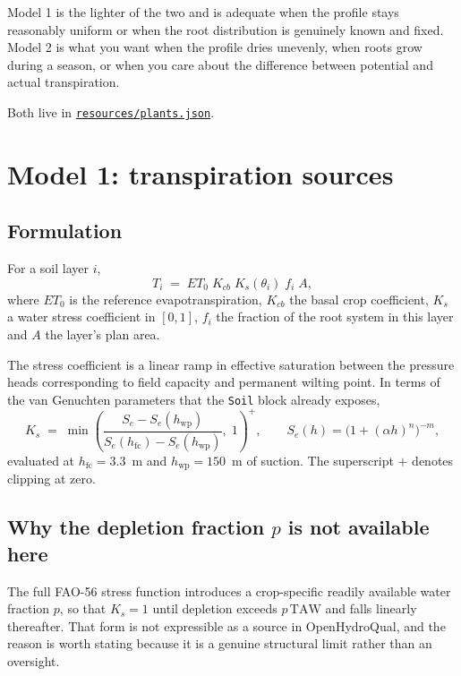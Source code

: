 \documentclass[11pt,a4paper]{article}
\newcommand{\code}[1]{\texttt{\small #1}}
\newcommand{\file}[1]{\texttt{\small #1}}
\newcommand{\ghbase}{https://github.com/ArashMassoudieh/OpenHydroQual/blob/master}
\newcommand{\exfile}[1]{\href{\ghbase/#1}{\file{#1}}}
\begin{document}
Model 1 is the lighter of the two and is adequate when the profile stays
reasonably uniform or when the root distribution is genuinely known and fixed.
Model 2 is what you want when the profile dries unevenly, when roots grow
during a season, or when you care about the difference between potential and
actual transpiration.

Both live in \exfile{resources/plants.json}.

\section{Model 1: transpiration sources}

\subsection{Formulation}

For a soil layer $i$,
\begin{equation}
T_i \;=\; ET_0 \; K_{cb} \; K_s(\theta_i) \; f_i \; A ,
\end{equation}
where $ET_0$ is the reference evapotranspiration, $K_{cb}$ the basal crop
coefficient, $K_s$ a water stress coefficient in $[0,1]$, $f_i$ the fraction of
the root system in this layer and $A$ the layer's plan area.

The stress coefficient is a linear ramp in effective saturation between the
pressure heads corresponding to field capacity and permanent wilting point. In
terms of the van Genuchten parameters that the \code{Soil} block already
exposes,
\begin{equation}
K_s \;=\; \min\!\left(
  \frac{S_e - S_e(h_{\mathrm{wp}})}{S_e(h_{\mathrm{fc}}) - S_e(h_{\mathrm{wp}})},\; 1
\right)^{\!+},
\qquad
S_e(h) = \bigl(1+(\alpha h)^n\bigr)^{-m},
\end{equation}
evaluated at $h_{\mathrm{fc}} = 3.3$~m and $h_{\mathrm{wp}} = 150$~m of suction.
The superscript $+$ denotes clipping at zero.

\subsection{Why the depletion fraction $p$ is not available here}

The full FAO-56 stress function introduces a crop-specific readily available
water fraction $p$, so that $K_s = 1$ until depletion exceeds $p\,\mathrm{TAW}$
and falls linearly thereafter. That form is not expressible as a source in
OpenHydroQual, and the reason is worth stating because it is a genuine
structural limit rather than an oversight.
\end{document}
